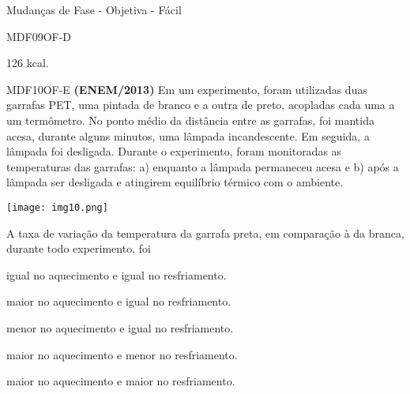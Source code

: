 \documentclass[12pt]{article}
\begin{document}
\begin{quiz}{Mudanças de Fase - Objetiva - Fácil}
\begin{multi}[points=1,penalty=0]{MDF09OF-D}
			\item 126 kcal. 
		\end{multi}
		\begin{multi}[points=1,penalty=0]{MDF10OF-E}
			\textbf{(ENEM/2013)} Em um experimento, foram utilizadas duas garrafas PET, uma pintada de branco e a outra de preto, acopladas cada uma a um termômetro. No ponto médio da distância entre as garrafas, foi mantida acesa, durante alguns minutos, uma lâmpada incandescente. Em seguida, a lâmpada foi desligada. Durante o experimento, foram monitoradas as temperaturas das garrafas: a) enquanto a lâmpada permaneceu acesa e b) após a lâmpada ser desligada e atingirem equilíbrio térmico com o ambiente.
			\begin{center}
				\texttt{[image: img10.png]}		
			\end{center}		
			A taxa de variação da temperatura da garrafa preta, em comparação à da branca, durante todo experimento, foi											
			\item igual no aquecimento e igual no resfriamento.
			\item maior no aquecimento e igual no resfriamento.
			\item menor no aquecimento e igual no resfriamento.
			\item maior no aquecimento e menor no resfriamento.
			\item* maior no aquecimento e maior no resfriamento.
		\end{multi}										
	\end{quiz}
\end{document}
